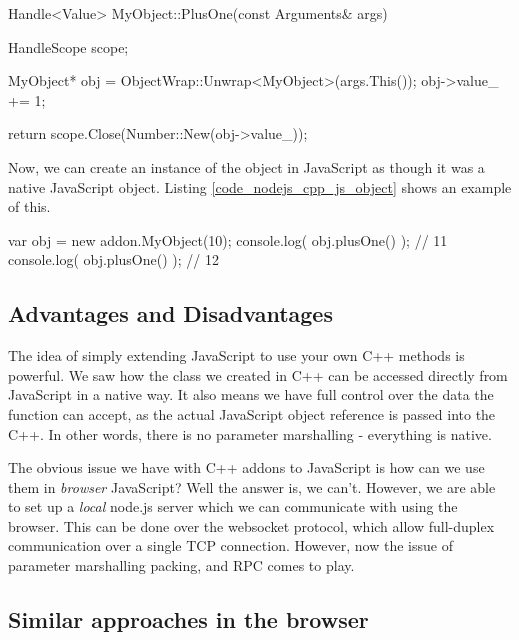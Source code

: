 \begin{code}
Handle<Value> MyObject::PlusOne(const Arguments& args) {
  HandleScope scope;

  MyObject* obj = ObjectWrap::Unwrap<MyObject>(args.This());
  obj->value_ += 1;

  return scope.Close(Number::New(obj->value_));
}
\end{code}

Now, we can create an instance of the object in JavaScript as though it was a native JavaScript object. Listing \ref{code_nodejs_cpp_js_object} shows an example of this.

\begin{code}
var obj = new addon.MyObject(10);
console.log( obj.plusOne() ); // 11
console.log( obj.plusOne() ); // 12
\end{code}

\subsection{Advantages and Disadvantages} %
\label{sub:nodejs_cpp_advantages_and_disadvantages}
The idea of simply extending JavaScript to use your own C++ methods is powerful. We saw how the class we created in C++ can be accessed directly from JavaScript in a native way. It also means we have full control over the data the function can accept, as the actual JavaScript object reference is passed into the C++. In other words, there is no parameter marshalling - everything is native.

The obvious issue we have with C++ addons to JavaScript is how can we use them in \emph{browser} JavaScript? Well the answer is, we can't. However, we are able to set up a \emph{local} node.js server which we can communicate with using the browser. This can be done over the websocket protocol, which allow full-duplex communication over a single TCP connection. However, now the issue of parameter marshalling packing, and RPC comes to play. 


\subsection{Similar approaches in the browser} %
\label{sub:cpp_js_similar_approaches_in_the_browser}

